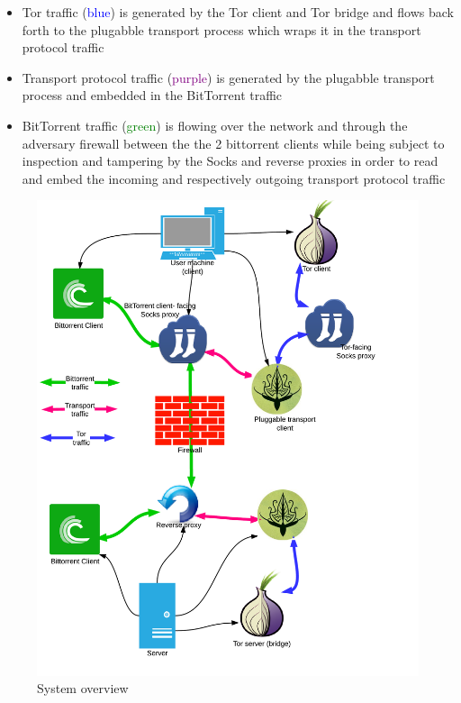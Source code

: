 \documentclass[11pt]{book} %
\begin{document}
\begin{itemize}
\item Tor traffic (\textcolor{blue}{blue}) is generated by the Tor client and Tor bridge and flows back forth to the plugabble transport process which wraps it in the transport protocol traffic 
\item Transport protocol traffic (\textcolor{purple}{purple}) is generated by the plugabble transport process and embedded in the BitTorrent traffic
\item  BitTorrent traffic (\textcolor{green}{green}) is flowing over the network and through the adversary firewall between the the 2 bittorrent clients while being subject to inspection and tampering by the Socks and reverse proxies in order to read and embed the incoming and respectively outgoing transport protocol traffic 
\end{itemize}

\begin{figure}[h!]
\begin{center}
\includegraphics[scale=0.23]{FuinSystemArchitecture}
\end{center}
 \caption{System overview}
 \label{fig:system_architecture}
 \end{figure}
\end{document}
